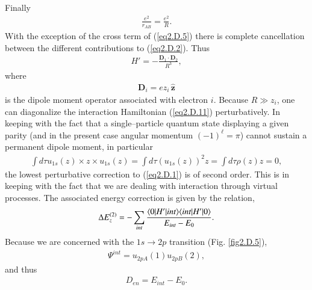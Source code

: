 \begin{subappendices}
Finally
\begin{align}\label{eq2.D.10}
\frac{e^2}{r_{AB}}=\frac{e^2}{R}.
\end{align}
With the exception of the cross term of (\ref{eq2.D.5}) there is complete cancellation between the different contributions to (\ref{eq2.D.2}). Thus
\begin{align}\label{eq2.D.11}
H'=-\frac{\mathbf D_1\cdot\mathbf D_2}{R^3},
\end{align} 
where
\begin{align}\label{eq2.D.12}
\mathbf D_i=ez_i\,\hat {\mathbf{z}}
\end{align} 
is the dipole moment operator associated with electron $i$. Because $R\gg z_i$, one can diagonalize the interaction Hamiltonian (\ref{eq2.D.11}) perturbatively. In keeping with the fact that   a single--particle quantum state displaying a given parity (and in the present case angular momentum $(-1)^\ell=\pi$) cannot sustain a permanent dipole moment, in particular
\begin{align}\label{eq2.D.13}
\int d\tau u_{1s}(z)\times z\times u_{1s}(z)=\int d\tau (u_{1s}(z))^2z=\int d\tau \rho(z)z=0,
\end{align} 
 the lowest perturbative correction to (\ref{eq2.D.1}) is of second order. This is in keeping with the fact that we are dealing with interaction through virtual processes. The associated energy correction is given by the relation,
 \begin{align}\label{eq2.D.14}
\Delta E_z^{(2)}=-\sum_{int}\frac{\langle {0|H'|int} \rangle\langle {int|H'|0} \rangle}{E_{int}-E_0}.
 \end{align} 
 Because we are concerned with the $1s\to 2p$ transition (Fig. \ref{fig2.D.5}),
  \begin{align}\label{eq2.D.15}
\Psi^{int}=u_{2pA}(1)u_{2pB}(2),
  \end{align} 
 and thus
  \begin{align}\label{eq2.D.16}
D_{en}=E_{int}-E_0.
   \end{align} 
   

\end{subappendices}

